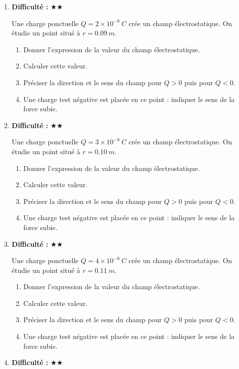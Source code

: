 \documentclass[11pt,a4paper]{article}
\newcommand{\etoiles}[1]{\textbf{Difficulté : }#1}
\begin{document}
\begin{enumerate}[label=\textbf{Exercice \arabic*.},leftmargin=*]
Deux masses ponctuelles $m_A=22\ \si{kg}$ et $m_B=45\ \si{kg}$ sont séparées par une distance $r=0.90\ \si{m}$.
\begin{enumerate}[label=\alph*)]
\item Calculer la valeur de la force gravitationnelle.
\item Étudier l'effet d'un doublement d'une des masses.
\item Étudier l'effet d'une division par 2 de la distance.
\item Commenter l'ordre de grandeur obtenu.
\end{enumerate}
\item \etoiles{★★}

Une charge ponctuelle $Q=2\times10^{-8}\ \si{C}$ crée un champ électrostatique. On étudie un point situé à $r=0.09\ \si{m}$.
\begin{enumerate}[label=\alph*)]
\item Donner l'expression de la valeur du champ électrostatique.
\item Calculer cette valeur.
\item Préciser la direction et le sens du champ pour $Q>0$ puis pour $Q<0$.
\item Une charge test négative est placée en ce point : indiquer le sens de la force subie.
\end{enumerate}
\item \etoiles{★★}

Une charge ponctuelle $Q=3\times10^{-8}\ \si{C}$ crée un champ électrostatique. On étudie un point situé à $r=0.10\ \si{m}$.
\begin{enumerate}[label=\alph*)]
\item Donner l'expression de la valeur du champ électrostatique.
\item Calculer cette valeur.
\item Préciser la direction et le sens du champ pour $Q>0$ puis pour $Q<0$.
\item Une charge test négative est placée en ce point : indiquer le sens de la force subie.
\end{enumerate}
\item \etoiles{★★}

Une charge ponctuelle $Q=4\times10^{-8}\ \si{C}$ crée un champ électrostatique. On étudie un point situé à $r=0.11\ \si{m}$.
\begin{enumerate}[label=\alph*)]
\item Donner l'expression de la valeur du champ électrostatique.
\item Calculer cette valeur.
\item Préciser la direction et le sens du champ pour $Q>0$ puis pour $Q<0$.
\item Une charge test négative est placée en ce point : indiquer le sens de la force subie.
\end{enumerate}
\item \etoiles{★★}


\end{enumerate}
\end{document}

